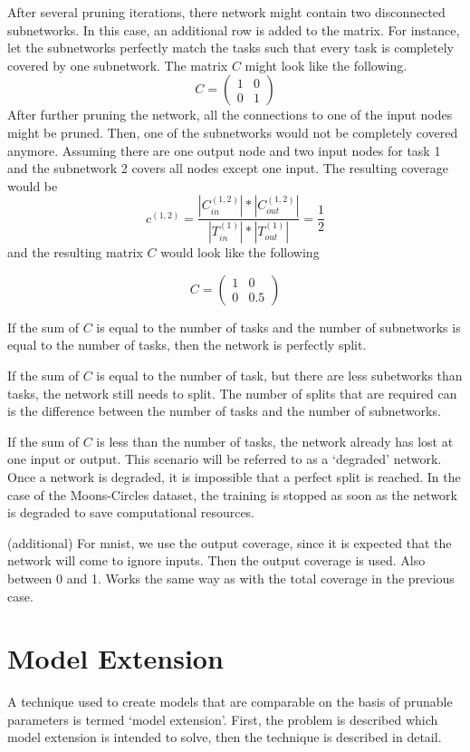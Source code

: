 After several pruning iterations, there network might contain two disconnected subnetworks.
In this case, an additional row is added to the matrix.
For instance, let the subnetworks perfectly match the tasks such that every task is completely covered by one subnetwork.
The matrix $C$ might look like the following.
$$
C = \begin{pmatrix}
    1 & 0 \\ 0 & 1
\end{pmatrix}
$$
After further pruning the network, all the connections to one of the input nodes might be pruned.
Then, one of the subnetworks would not be completely covered anymore.
Assuming there are one output node and two input nodes for task 1 and the subnetwork 2 covers all nodes except one input.
The resulting coverage would be 
$$
c^{(1,2)} =  \frac{
    | C^{(1,2)}_{in}| * | C^{(1,2)}_{out} |
    }{
    |T^{(1)}_{in}| * |T^{(1)}_{out}|
} = \frac{1}{2}
$$
and the resulting matrix $C$ would look like the following

$$
C = \begin{pmatrix}
    1 & 0 \\ 0 & 0.5
\end{pmatrix}
$$

If the sum of $C$ is equal to the number of tasks and the number of subnetworks is equal to the number of tasks, then the network is perfectly split.

If the sum of $C$ is equal to the number of task, but there are less subetworks than tasks, the network still needs to split.
The number of splits that are required can is the difference between the number of tasks and the number of subnetworks.

If the sum of $C$ is less than the number of tasks, the network already has lost at one input or output.
This scenario will be referred to as a `degraded' network.
Once a network is degraded, it is impossible that a perfect split is reached.
In the case of the Moons-Circles dataset, the training is stopped as soon as the network is degraded to save computational resources.

(additional)
For mnist, we use the output coverage, since it is expected that the network will come to ignore inputs.
Then the output coverage is used. Also between 0 and 1. Works the same way as with the total coverage in the previous case.

\section{Model Extension}
A technique used to create models that are comparable on the basis of prunable parameters is termed `model extension'. First, the problem is described which model extension is intended to solve, then the technique is described in detail.

